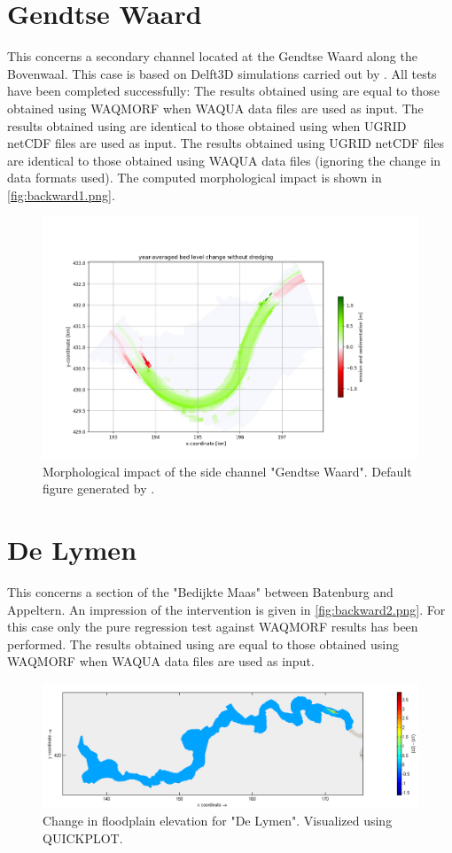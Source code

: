 \section{Gendtse Waard}\label{Sec:GendtseWaard_backward}
This concerns a secondary channel located at the Gendtse Waard along the Bovenwaal.
This case is based on Delft3D simulations carried out by \citet{Ottevangeretal2016}.
All tests have been completed successfully:
The results obtained using  are equal to those obtained using WAQMORF when WAQUA data files are used as input.
The results obtained using  are identical to those obtained using  when UGRID netCDF files are used as input. 
The results obtained using UGRID netCDF files are identical to those obtained using WAQUA data files (ignoring the change in data formats used).
The computed morphological impact is shown in \autoref{fig:backward1.png}.

\begin{figure}[H]
\center
\includegraphics[width=12cm]{figures/report_Figure1.png}
\caption{Morphological impact of the side channel "Gendtse Waard".
Default figure generated by \dfmi.}
\label{fig:backward1.png}
\end{figure}

\section{De Lymen}\label{Sec:DeLymen_backward}
This concerns a section of the "Bedijkte Maas" between Batenburg and Appeltern.
An impression of the intervention is given in \autoref{fig:backward2.png}.
For this case only the pure regression test against WAQMORF results has been performed.
The results obtained using  are equal to those obtained using WAQMORF when WAQUA data files are used as input.

\begin{figure}[H]
\center
\includegraphics[width=12cm]{figures/Lymen_dz.png}
\caption{Change in floodplain elevation for "De Lymen".
Visualized using QUICKPLOT.}
\label{fig:backward2.png}
\end{figure}